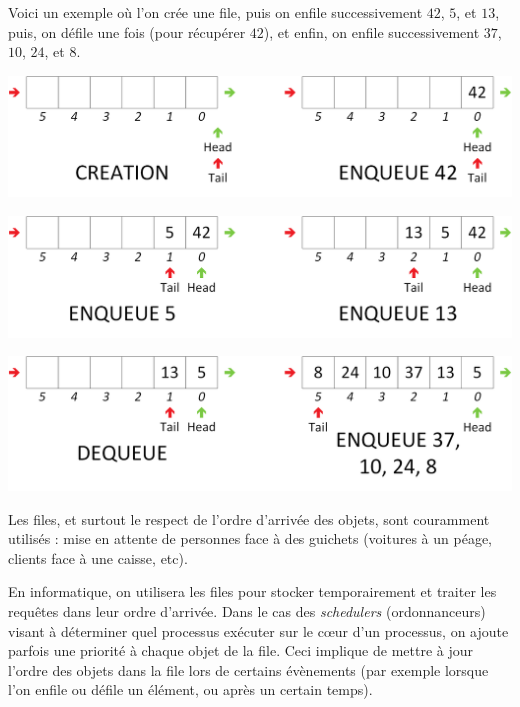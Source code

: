 Voici un exemple où l'on crée une file, puis on enfile successivement $ 42 $, $ 5 $, et $ 13 $, puis, on défile une fois (pour récupérer $ 42 $), et enfin, on enfile successivement $ 37 $, $ 10 $, $ 24 $, et $ 8 $.\\

\begin{center}
\includegraphics[scale=0.65]{Cours/Files_2_Structure_Generale_Usage_pack_1.png}
\end{center}

\begin{center}
\includegraphics[scale=0.65]{Cours/Files_2_Structure_Generale_Usage_pack_2.png}
\end{center}

\begin{center}
\includegraphics[scale=0.65]{Cours/Files_2_Structure_Generale_Usage_pack_3.png}
\end{center}

\smallskip

Les files, et surtout le respect de l'ordre d'arrivée des objets, sont couramment utilisés : mise en attente de personnes face à des guichets (voitures à un péage, clients face à une caisse, etc).

En informatique, on utilisera les files pour stocker temporairement et traiter les requêtes dans leur ordre d'arrivée.
Dans le cas des \textit{schedulers} (ordonnanceurs) visant à déterminer quel processus exécuter sur le c\oe{}ur d'un processus, on ajoute parfois une priorité à chaque objet de la file.
Ceci implique de mettre à jour l'ordre des objets dans la file lors de certains évènements (par exemple lorsque l'on enfile ou défile un élément, ou après un certain temps).\\

